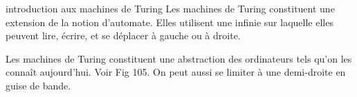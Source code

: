 \begin{remarque}{}{introduction aux machines de Turing}
    Les machines de Turing constituent une extension de la notion d'automate. Elles utilisent une infinie sur laquelle elles peuvent lire, écrire, et se déplacer à gauche ou à droite.

    \begin{center}
    \end{center}

    Les machines de Turing constituent une abstraction des ordinateurs tels qu'on les connaît aujourd'hui. Voir Fig 105. On peut aussi se limiter à une demi-droite en guise de bande.
\end{remarque}

